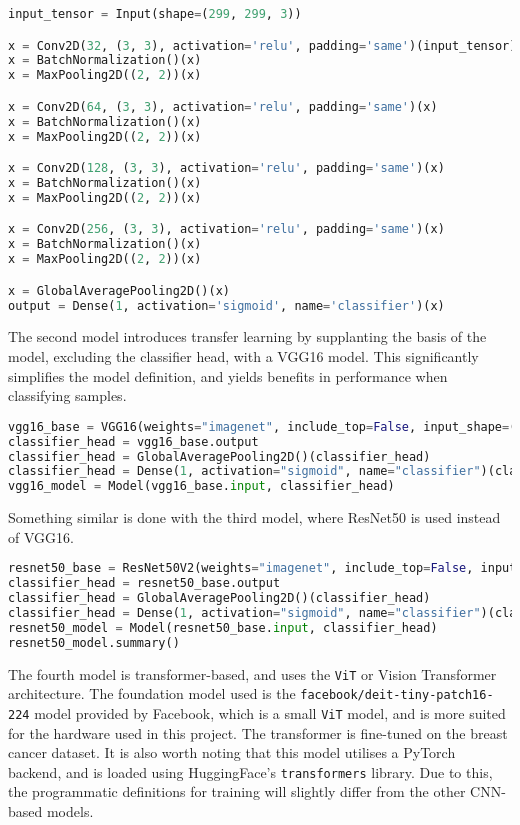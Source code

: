\documentclass[../main]{subfiles}
\begin{document}
\begin{lstlisting}[language=Python, caption={Custom CNN definition.}]
input_tensor = Input(shape=(299, 299, 3))

x = Conv2D(32, (3, 3), activation='relu', padding='same')(input_tensor)
x = BatchNormalization()(x)
x = MaxPooling2D((2, 2))(x)

x = Conv2D(64, (3, 3), activation='relu', padding='same')(x)
x = BatchNormalization()(x)
x = MaxPooling2D((2, 2))(x)

x = Conv2D(128, (3, 3), activation='relu', padding='same')(x)
x = BatchNormalization()(x)
x = MaxPooling2D((2, 2))(x)

x = Conv2D(256, (3, 3), activation='relu', padding='same')(x)
x = BatchNormalization()(x)
x = MaxPooling2D((2, 2))(x)

x = GlobalAveragePooling2D()(x)
output = Dense(1, activation='sigmoid', name='classifier')(x)
\end{lstlisting}

\noindent The second model introduces transfer learning by supplanting the basis
of the model, excluding the classifier head, with a VGG16 model. This
significantly simplifies the model definition, and yields benefits in
performance when classifying samples.

\begin{lstlisting}[language=Python, caption={VGG16 model definition.}]
vgg16_base = VGG16(weights="imagenet", include_top=False, input_shape=(299, 299, 3))
classifier_head = vgg16_base.output
classifier_head = GlobalAveragePooling2D()(classifier_head)
classifier_head = Dense(1, activation="sigmoid", name="classifier")(classifier_head)
vgg16_model = Model(vgg16_base.input, classifier_head)
\end{lstlisting}

\noindent Something similar is done with the third model, where ResNet50 is used instead of VGG16.

\begin{lstlisting}[language=Python, caption={ResNet50 model definition.}]
resnet50_base = ResNet50V2(weights="imagenet", include_top=False, input_shape=(299, 299, 3))
classifier_head = resnet50_base.output
classifier_head = GlobalAveragePooling2D()(classifier_head)
classifier_head = Dense(1, activation="sigmoid", name="classifier")(classifier_head)
resnet50_model = Model(resnet50_base.input, classifier_head)
resnet50_model.summary()
\end{lstlisting}

\noindent The fourth model is transformer-based, and uses the \texttt{ViT} or
Vision Transformer architecture. The foundation model used is the
\texttt{facebook/deit-tiny-patch16-224} model provided by Facebook, which is a
small \texttt{ViT} model, and is more suited for the hardware used in this
project. The transformer is fine-tuned on the breast cancer dataset. It is also
worth noting that this model utilises a PyTorch backend, and is loaded using
HuggingFace's \texttt{transformers} library. Due to this, the programmatic
definitions for training will slightly differ from the other CNN-based models.
\end{document}
